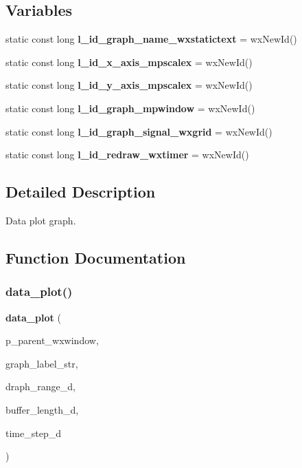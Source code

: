 \subsection*{Variables}
\begin{DoxyCompactItemize}
\item 
static const long \textbf{ l\+\_\+id\+\_\+graph\+\_\+name\+\_\+wxstatictext} = wx\+New\+Id()
\item 
\mbox{\label{group___data__plot_ga64116a5bb4acf43245cede80ba9aeda7}} 
static const long {\bfseries l\+\_\+id\+\_\+x\+\_\+axis\+\_\+mpscalex} = wx\+New\+Id()
\item 
\mbox{\label{group___data__plot_ga9287f0398cabdf44fed0917d5b29755a}} 
static const long {\bfseries l\+\_\+id\+\_\+y\+\_\+axis\+\_\+mpscalex} = wx\+New\+Id()
\item 
\mbox{\label{group___data__plot_ga42fc81a312aa4155d3b292bbbf67b6e9}} 
static const long {\bfseries l\+\_\+id\+\_\+graph\+\_\+mpwindow} = wx\+New\+Id()
\item 
\mbox{\label{group___data__plot_gac3357130ffef1c84e586d278db565272}} 
static const long {\bfseries l\+\_\+id\+\_\+graph\+\_\+signal\+\_\+wxgrid} = wx\+New\+Id()
\item 
\mbox{\label{group___data__plot_gac8c0e823a4f037f722fce17e43279999}} 
static const long {\bfseries l\+\_\+id\+\_\+redraw\+\_\+wxtimer} = wx\+New\+Id()
\end{DoxyCompactItemize}


\subsection{Detailed Description}
Data plot graph. 



\subsection{Function Documentation}
\mbox{\label{group___data__plot_ga2ef6cac71bb8bfc3813b645905bb612f}} 
\subsubsection{data\_plot()}
{\footnotesize\ttfamily \textbf{ data\+\_\+plot} (\begin{DoxyParamCaption}\item[{wx\+Window $\ast$}]{p\+\_\+parent\+\_\+wxwindow,  }\item[{wx\+String}]{graph\+\_\+label\+\_\+str,  }\item[{double}]{draph\+\_\+range\+\_\+d,  }\item[{double}]{buffer\+\_\+length\+\_\+d,  }\item[{double}]{time\+\_\+step\+\_\+d }\end{DoxyParamCaption})}



